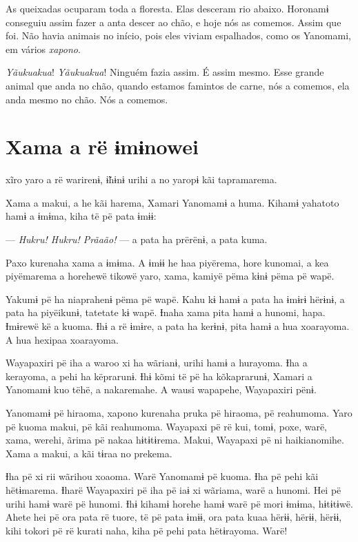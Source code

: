 As queixadas ocuparam toda a floresta. Elas desceram rio abaixo.
 Horonamɨ conseguiu assim fazer a anta descer ao chão, e hoje nós as
 comemos. Assim que foi. Não havia animais no início, pois eles viviam
 espalhados, como os Yanomami, em vários \textit{xapono}.

\textit{Yãukuakua}! \textit{Yãukuakua}! Ninguém fazia assim. É assim mesmo. Esse
 grande animal que anda no chão, quando estamos famintos de carne, nós a
 comemos, ela anda mesmo no chão. Nós a comemos.

\chapter{Xama a rë ɨmɨnowei}
 
 xĩro yaro a rë warirenɨ, ɨ̃hɨnɨ urihi a no yaropɨ kãi tapramarema. 

Xama a makui, a he kãi harema, Xamari Yanomamɨ a huma. Kihamɨ yahatoto
hamɨ a ɨmɨma, kiha të pë pata ɨmɨɨ: 

--- \textit{Hukru! Hukru! Prãaão!} --- a pata ha prërënɨ, a pata kuma. 

Paxo kurenaha xama a ɨmɨma. A ɨmɨɨ he haa piyërema, hore kunomai, a kea
piyëmarema a horehewë tikowë yaro, xama, kamiyë pëma kɨnɨ pëma pë wapë. 

Yakumɨ pë ha niaprahenɨ pëma pë wapë. Kahu kɨ hamɨ a pata ha ɨmɨrɨ
hërɨnɨ, a pata ha piyëikunɨ, tatetate kɨ wapë. Ɨnaha xama pita hamɨ a
hunomi, hapa. Ɨmɨrewë kë a kuoma. Ɨhɨ a rë ɨmɨre, a pata ha kerɨnɨ, pita
hamɨ a hua xoarayoma. A hua hexipaa xoarayoma. 

Wayapaxiri pë iha a waroo xi ha wãrianɨ, urihi hamɨ a hurayoma. Ɨha a
kerayoma, a pehi ha këprarunɨ. Ɨhɨ kõmi të pë ha kõkaprarunɨ, Xamari a
Yanomamɨ kuo tëhë, a nakaremahe. A wausi wapapehe, Wayapaxiri pënɨ.

 Yanomamɨ pë hiraoma, xapono kurenaha pruka pë hiraoma, pë reahumoma.
Yaro pë kuoma makui, pë kãi reahumoma. Wayapaxi pë rë kui, tomɨ, poxe,
warë, xama, werehi, ãrima pë nakaa hɨtɨtɨrema. Makui, Wayapaxi pë ni
haikianomihe. Xama a makui, a kãi tɨraa no prekema. 

Ɨha pë xi rii wãrihou xoaoma. Warë Yanomamɨ pë kuoma. Ɨha pë pehi kãi
 hëtɨmarema. Ɨharë Wayapaxiri pë iha pë iaɨ xi wãriama, warë a hunomi.
 Hei pë urihi hamɨ warë pë hunomi. Ɨhɨ kihamɨ horehe hamɨ warë pë mori
 ɨmɨma, hɨtɨtɨwë. Ahete hei pë ora pata rë tuore, të pë pata ɨmɨɨ, ora
 pata kuaa hërɨɨ, hërɨɨ, hërɨɨ, kihi tokori pë rë kurati naha, kiha pë
 pehi pata hëtɨrayoma. Warë! 

